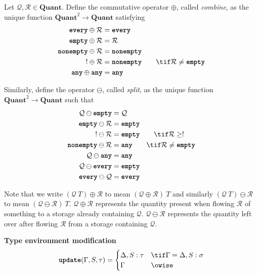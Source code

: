 \documentclass[10pt]{article}
\begin{document}
\begin{definition}
    Let $\mathcal{Q}, \mathcal{R} \in \textbf{Quant}$.
    Define the commutative operator $\oplus$, called \emph{combine}, as the unique function $\textbf{Quant}^2 \to \textbf{Quant}$ satisfying
    \begin{align*}
        \every \oplus \mathcal{R} &= \every \\
        \emptyq \oplus \mathcal{R} &= \mathcal{R} \\
        \nonempty \oplus \mathcal{R} &= \nonempty \\
        \exactlyone \oplus \mathcal{R} &= \nonempty \qquad \tif \mathcal{R} \neq \emptyq \\
        \any \oplus \any &= \any
    \end{align*}

    Similarly, define the operator $\ominus$, called \emph{split}, as the unique function $\textbf{Quant}^2 \to \textbf{Quant}$ such that
    \begin{align*}
        \mathcal{Q} \ominus \emptyq & = \mathcal{Q} \\
        \emptyq \ominus \mathcal{R} & = \emptyq \\
        \exactlyone \ominus \mathcal{R} &= \emptyq \qquad \tif \mathcal{R} \geq \exactlyone \\
        \nonempty \ominus \mathcal{R} &= \any \qquad \tif \mathcal{R} \neq \emptyq \\
        \mathcal{Q} \ominus \any &= \any \\
        \mathcal{Q} \ominus \every & = \emptyq \\
        \every \ominus \mathcal{Q} &= \every
    \end{align*}
\end{definition}

Note that we write $(\mathcal{Q}~T) \oplus \mathcal{R}$ to mean $(\mathcal{Q} \oplus \mathcal{R})~T$ and similarly $(\mathcal{Q}~T) \ominus \mathcal{R}$ to mean $(\mathcal{Q} \ominus \mathcal{R})~T$.
$\mathcal{Q} \oplus \mathcal{R}$ represents the quantity present when flowing $\mathcal{R}$ of something to a storage already containing $\mathcal{Q}$.
$\mathcal{Q} \ominus \mathcal{R}$ represents the quantity left over after flowing $\mathcal{R}$ from a storage containing $\mathcal{Q}$.

 \textbf{Type environment modification}
\[
    \update(\Gamma, S, \tau) =
    \begin{cases}
        \Delta, S : \tau & \tif \Gamma = \Delta, S : \sigma \\
        \Gamma & \owise
    \end{cases}
\]
\end{document}
